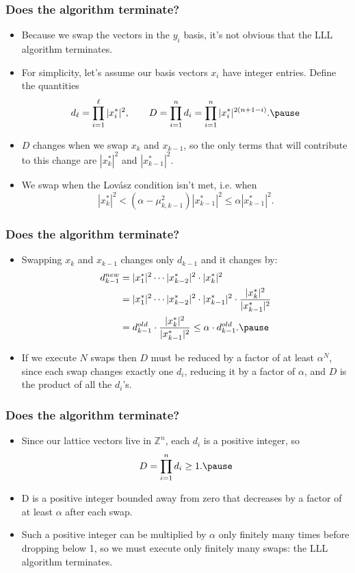 \documentclass{beamer}
\newcommand{\integers}{\mathbb{Z}}
\begin{document}
\begin{frame}
	\frametitle{Does the algorithm terminate?}
	\begin{itemize}
		\item Because we swap the vectors in the $y_i$ basis, it's not obvious that the LLL algorithm terminates.\pause
		\item For simplicity, let's assume our basis vectors $x_i$ have integer entries. Define the quantities
		\[
		d_\ell = \prod_{i=1}^\ell |x_i^*|^2,\qquad D = \prod_{i=1}^nd_i = \prod_{i=1}^n|x_i^*|^{2(n+1-i)}.\pause
		\]
		\item $D$ changes when we swap $x_k$ and $x_{k-1}$, so the only terms that will contribute to this change are $|x_k^*|^2$ and $|x_{k-1}^*|^2$.\pause
		\item We swap when the Lov\'asz condition isn't met, i.e. when
		\[
		|x_k^*|^2 <(\alpha - \mu_{k,k-1}^2)|x_{k-1}^*|^2 \leq \alpha |x_{k-1}^*|^2.
		\] 
	\end{itemize}
\end{frame}

\begin{frame}
	\frametitle{Does the algorithm terminate?}
	\begin{itemize}
		\item Swapping $x_k$ and $x_{k-1}$ changes only $d_{k-1}$ and it changes by:
		\begin{align*}
			d_{k-1}^{new} &= |x_1^*|^2 \cdots |x_{k-2}^*|^2\cdot|x_k^*|^2\\
			&= |x_1^*|^2 \cdots |x_{k-2}^*|^2\cdot |x_{k-1}^*|^2\cdot \frac{|x_k^*|^2}{|x_{k-1}^*|^2}\\
			&= d_{k-1}^{old}\cdot \frac{|x_k^*|^2}{|x_{k-1}^*|^2} \leq \alpha\cdot  d_{k-1}^{old}.\pause
		\end{align*}
		\item If we execute $N$ swaps then $D$ must be reduced by a factor of at least $\alpha^N$, since each swap changes exactly one $d_i$, reducing it by a factor of $\alpha$, and $D$ is the product of all the $d_i$'s.
	\end{itemize}
\end{frame}

\begin{frame}
	\frametitle{Does the algorithm terminate?}
	\begin{itemize}
		\item Since our lattice vectors live in $\integers^n$, each $d_i$ is a positive integer, so
		\[
		D = \prod_{i=1}^nd_i \geq 1.\pause
		\]
		\item D is a positive integer bounded away from zero that decreases by a factor of at least $\alpha$ after each swap.\pause
		\item Such a positive integer can be multiplied by $\alpha$ only finitely many times before dropping below 1, so we must execute only finitely many swaps: the LLL algorithm terminates.
	\end{itemize}
\end{frame}
\end{document}
